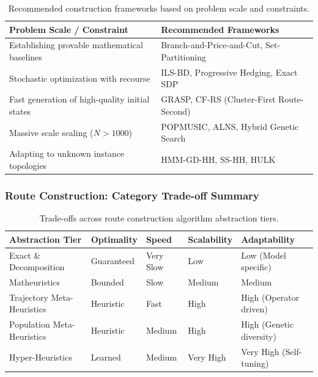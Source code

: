 \documentclass{article}
\begin{document}
\begin{table}[H]
    \centering
    \caption{Recommended construction frameworks based on problem scale and constraints.}
    \begin{tabularx}{\textwidth}{@{} l X @{}}
        \toprule
        \textbf{Problem Scale / Constraint} & \textbf{Recommended Frameworks} \\
        \midrule
        Establishing provable mathematical baselines & Branch-and-Price-and-Cut, Set-Partitioning \\
        Stochastic optimization with recourse & ILS-BD, Progressive Hedging, Exact SDP \\
        Fast generation of high-quality initial states & GRASP, CF-RS (Cluster-First Route-Second) \\
        Massive scale scaling ($N > 1000$) & POPMUSIC, ALNS, Hybrid Genetic Search \\
        Adapting to unknown instance topologies & HMM-GD-HH, SS-HH, HULK \\
        \bottomrule
    \end{tabularx}
\end{table}

\subsubsection*{Route Construction: Category Trade-off Summary}

\begin{table}[H]
    \centering
    \caption{Trade-offs across route construction algorithm abstraction tiers.}
    \begin{tabularx}{\textwidth}{@{} X l l l X @{}}
        \toprule
        \textbf{Abstraction Tier} & \textbf{Optimality} & \textbf{Speed} & \textbf{Scalability} & \textbf{Adaptability} \\
        \midrule
        Exact \& Decomposition & Guaranteed & Very Slow & Low & Low (Model specific) \\
        Matheuristics & Bounded & Slow & Medium & Medium \\
        Trajectory Meta-Heuristics& Heuristic & Fast & High & High (Operator driven) \\
        Population Meta-Heuristics& Heuristic & Medium & High & High (Genetic diversity) \\
        Hyper-Heuristics & Learned & Medium & Very High & Very High (Self-tuning) \\
        \bottomrule
    \end{tabularx}
\end{table}
\end{document}
